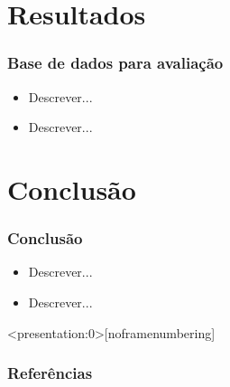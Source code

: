 \documentclass[aspectratio=34, 14pt]{latex-slides}
\begin{document}
    \section{Resultados}
    \begin{frame}
        \frametitle{Base de dados para avaliação}

        \begin{itemize}
            \item Descrever...
            \item Descrever...
        \end{itemize}
    \end{frame}

    \section{Conclusão}
    \begin{frame}
        \frametitle{Conclusão}

         \begin{itemize}
            \item Descrever... \cite{nunes2017local}
            \item Descrever...
        \end{itemize}
    \end{frame}

    \begin{frame}<presentation:0>[noframenumbering] %
        \frametitle{Referências}

        \small
        
    \end{frame}

    \begin{frame}
        \titlepage
    \end{frame}
\end{document}
